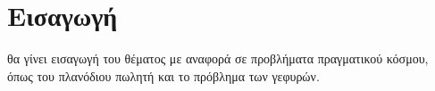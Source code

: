 \section{Εισαγωγή}
θα γίνει εισαγωγή του θέματος με αναφορά σε προβλήματα πραγματικού κόσμου, όπως του πλανόδιου πωλητή και το πρόβλημα των γεφυρών.


